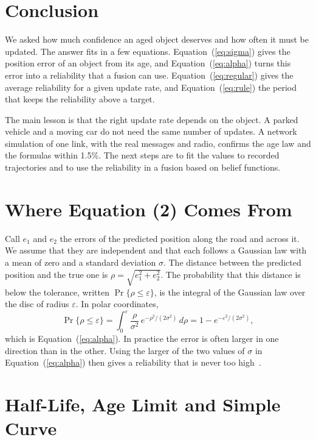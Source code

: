 \documentclass[conference]{IEEEtran}
\newcommand{\Eq}[1]{Equation~(\ref{#1})}     %
\begin{document}
\section{Conclusion}

We asked how much confidence an aged object deserves and how often it must be
updated. The answer fits in a few equations. \Eq{eq:sigma} gives the position
error of an object from its age, and \Eq{eq:alpha} turns this error into a
reliability that a fusion can use. \Eq{eq:regular} gives the average
reliability for a given update rate, and \Eq{eq:rule} the period that keeps
the reliability above a target.

The main lesson is that the right update rate depends on the object. A parked
vehicle and a moving car do not need the same number of updates. A network
simulation of one link, with the real messages and radio, confirms the age
law and the formulas within 1.5\%. The next steps are to fit the values to
recorded trajectories and to use the reliability in a fusion based on belief
functions.

\appendices

\section{Where Equation (2) Comes From}\label{app:alpha}

Call $e_1$ and $e_2$ the errors of the predicted position along the road and
across it. We assume that they are independent and that each follows a
Gaussian law with a mean of zero and a standard deviation $\sigma$. The
distance between the predicted position and the true one is
$\rho=\sqrt{e_1^2+e_2^2}$. The probability that this distance is below the
tolerance, written $\Pr\{\rho\le\varepsilon\}$, is the integral of the Gaussian
law over the disc of radius $\varepsilon$. In polar coordinates,
\begin{equation}
\Pr\{\rho\le\varepsilon\}=\int_0^{\varepsilon}\frac{\rho}{\sigma^2}\,
e^{-\rho^2/(2\sigma^2)}\,d\rho=1-e^{-\varepsilon^2/(2\sigma^2)},
\end{equation}
which is \Eq{eq:alpha}. In practice the error is often larger in one direction
than in the other. Using the larger of the two values of $\sigma$ in
\Eq{eq:alpha} then gives a reliability that is never too
high~\cite{anderson1955}.

\section{Half-Life, Age Limit and Simple Curve}\label{app:ages}
\end{document}
